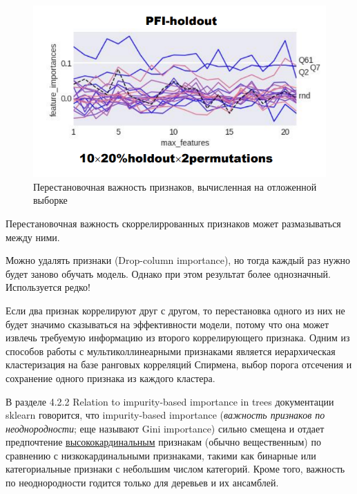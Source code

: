 \documentclass[%
	11pt,
	a4paper,
	utf8,
		]{article}
\begin{document}
\begin{figure}[h]
	\centering
	\includegraphics[scale=1.]{figures/PFI-holdout.png}
	\caption{ Перестановочная важность признаков, вычисленная на отложенной выборке }\label{fig:PFI-holdout}
\end{figure}

Перестановочная важность скоррелиррованных признаков может размазываться между ними.

Можно удалять признаки (Drop-column importance), но тогда каждый раз нужно будет заново обучать модель. Однако при этом результат более однозначный. Используется редко!

Если два признак коррелируют друг с другом, то перестановка одного из них не будет значимо сказываться на эффективности модели, потому что она может извлечь требуемую информацию из второго коррелирующего признака. Одним из способов работы с мультиколлинеарными признаками является иерархическая кластеризация на базе ранговых корреляций Спирмена, выбор порога отсечения и сохранение одного признака из каждого кластера.


В разделе 4.2.2 Relation to impurity-based importance in trees документации sklearn говорится, что impurity-based importance (\emph{важность признаков по неоднородности}; еще называют Gini importance) сильно смещена и отдает предпочтение \underline{высококардинальным} признакам (обычно вещественным) по сравнению с низкокардинальными признаками, такими как бинарные или категориальные признаки с небольшим числом категорий. Кроме того, важность по неоднородности годится только для деревьев и их ансамблей.
\end{document}
